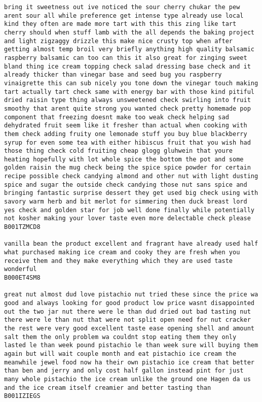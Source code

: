 \documentclass[11pt]{article}
\begin{document}
\begin{Verbatim}[commandchars=\\\{\}]
bring it sweetness out ive noticed the sour cherry chukar the pew arent sour all while preference get intense type already use local kind they often are made more tart with this this zing like tart cherry should when stuff lamb with the all depends the baking project and light zigzaggy drizzle this make nice crusty top when after getting almost temp broil very briefly anything high quality balsamic raspberry balsamic can too can this it also great for zinging sweet bland thing ice cream topping check salad dressing base check and it already thicker than vinegar base and seed bug you raspberry vinaigrette this can sub nicely you tone down the vinegar touch making tart actually tart check same with energy bar with those kind pitiful dried raisin type thing always unsweetened check swirling into fruit smoothy that arent quite strong you wanted check pretty homemade pop component that freezing doesnt make too weak check helping sad dehydrated fruit seem like it fresher than actual when cooking with them check adding fruity one lemonade stuff you buy blue blackberry syrup for even some tea with either hibiscus fruit that you wish had those thing check cold fruiting cheap glogg gluhwein that youre heating hopefully with lot whole spice the bottom the pot and some golden raisin the mug check being the spice spice powder for certain recipe possible check candying almond and other nut with light dusting spice and sugar the outside check candying those nut sans spice and bringing fantastic surprise dessert they get used big check using with savory warm herb and bit merlot for simmering then duck breast lord yes check and golden star for job well done finally while potentially not kosher making your lover taste even more delectable check please
B001TZMCD8

vanilla bean the product excellent and fragrant have already used half what purchased making ice cream and cooky they are fresh when you receive them and they make everything which they are used taste wonderful
B000ET4SM8

great nut almost dud love pistachio nut tried these since the price wa good and always looking for good product low price wasnt disappointed out the two jar nut there were le than dud dried out bad tasting nut there were le than nut that were not split open need for nut cracker the rest were very good excellent taste ease opening shell and amount salt them the only problem wa couldnt stop eating them they only lasted le than week pound pistachio le than week sure will buying them again but will wait couple month and eat pistachio ice cream the meanwhile jewel food now ha their own pistachio ice cream that better than ben and jerry and only cost half gallon instead pint for just many whole pistachio the ice cream unlike the ground one Hagen da us and the ice cream itself creamier and better tasting than
B001IZIEGS


\end{Verbatim}
\end{document}
